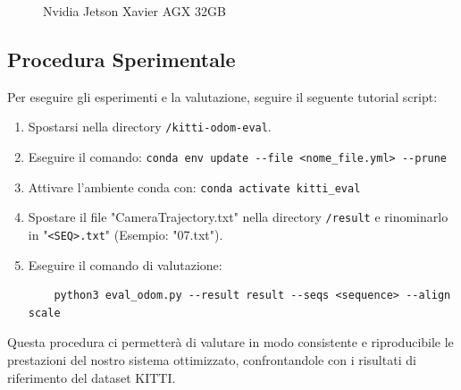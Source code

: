\documentclass[12pt,a4paper]{report}
\begin{document}
\begin{figure}[H]
    \centering
    \caption{Nvidia Jetson Xavier AGX 32GB \cite{board-specific}}
\end{figure}

\subsection{Procedura Sperimentale}

Per eseguire gli esperimenti e la valutazione, seguire il seguente tutorial script:

\begin{enumerate}
    \item Spostarsi nella directory \texttt{/kitti-odom-eval}.
    \item Eseguire il comando: \verb|conda env update --file <nome_file.yml> --prune|
    \item Attivare l'ambiente conda con: \verb|conda activate kitti_eval|
    \item Spostare il file "CameraTrajectory.txt" nella directory \texttt{/result} e rinominarlo in "\texttt{<SEQ>.txt}" (Esempio: "07.txt").
    \item Eseguire il comando di valutazione: 
    \begin{verbatim}
    python3 eval_odom.py --result result --seqs <sequence> --align scale
    \end{verbatim}
\end{enumerate}

Questa procedura ci permetterà di valutare in modo consistente e riproducibile le prestazioni del nostro sistema ottimizzato, confrontandole con i risultati di riferimento del dataset KITTI.
\end{document}
